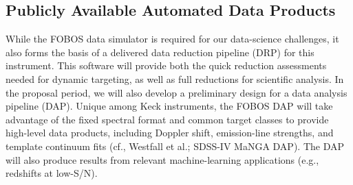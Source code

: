 \documentclass[oneside,11pt]{amsart}
\begin{document}



\subsection{Publicly Available Automated Data Products}
\label{sec:DAP}

While the FOBOS data simulator is required for our data-science challenges, it also forms the basis of a delivered data
reduction pipeline (DRP) for this instrument.  This software will provide both the quick reduction assessments needed
for dynamic targeting, as well as full reductions for scientific analysis.  In the proposal period, we will also develop a preliminary design for a data analysis
pipeline (DAP).  Unique among Keck instruments, the FOBOS DAP will take advantage of the fixed spectral format and common target classes to provide high-level data products, including
Doppler shift, emission-line strengths, and template continuum fits (cf.,
Westfall et al.; SDSS-IV MaNGA DAP).  The DAP will also produce results from relevant machine-learning applications (e.g., redshifts at low-S/N).
\end{document}
